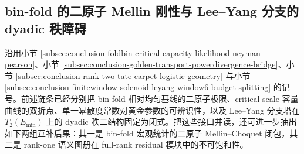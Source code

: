 \subsection{bin-fold 的二原子 Mellin 刚性与 Lee--Yang 分支的 dyadic 秩障碍}\label{subsec:conclusion-binfold-twoatom-mellin-leyang-dyadic-rank}

沿用小节 \ref{subsec:conclusion-foldbin-critical-capacity-likelihood-neyman-pearson}、小节 \ref{subsec:conclusion-golden-transport-powerdivergence-bridge}、小节 \ref{subsec:conclusion-rank-two-tate-carpet-logistic-geometry} 与小节 \ref{subsec:conclusion-finitewindow-solenoid-leyang-window6-budget-splitting} 的记号。前述链条已经分别把 bin-fold 相对均匀基线的二原子极限、critical-scale 容量曲线的双折点、单一幂散度常数对黄金参数的可辨识性，以及 Lee--Yang 分支塔在 \(T_2(E_{\min})\) 上的 dyadic 秩二结构固定为闭式。把这些接口并读，还可进一步抽出如下两组互补后果：其一是 bin-fold 宏观统计的二原子 Mellin--Choquet 闭包，其二是 rank-one 语义图册在 full-rank residual 模块中的不可饱和性。


